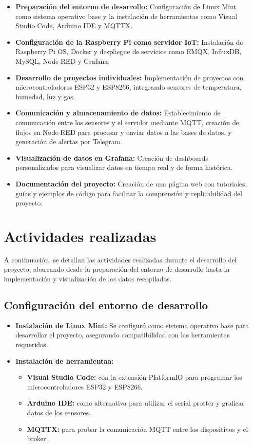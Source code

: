 \begin{itemize}
    \item \textbf{Preparación del entorno de desarrollo:} Configuración de Linux Mint como sistema operativo base y la instalación de herramientas como Visual Studio Code, Arduino IDE y MQTTX.
    \item \textbf{Configuración de la Raspberry Pi como servidor IoT:} Instalación de Raspberry Pi OS, Docker y despliegue de servicios como EMQX, InfluxDB, MySQL, Node-RED y Grafana.
    \item \textbf{Desarrollo de proyectos individuales:} Implementación de proyectos con microcontroladores ESP32 y ESP8266, integrando sensores de temperatura, humedad, luz y gas.
    \item \textbf{Comunicación y almacenamiento de datos:} Establecimiento de comunicación entre los sensores y el servidor mediante MQTT, creación de flujos en Node-RED para procesar y enviar datos a las bases de datos, y generación de alertas por Telegram.
    \item \textbf{Visualización de datos en Grafana:} Creación de dashboards personalizados para visualizar datos en tiempo real y de forma histórica.
    \item \textbf{Documentación del proyecto:} Creación de una página web con tutoriales, guías y ejemplos de código para facilitar la comprensión y replicabilidad del proyecto.
\end{itemize}

\section{Actividades realizadas}

A continuación, se detallan las actividades realizadas durante el desarrollo del proyecto, abarcando desde la preparación del entorno de desarrollo hasta la implementación y visualización de los datos recopilados.

\subsection*{Configuración del entorno de desarrollo}

\begin{itemize}
    \item \textbf{Instalación de Linux Mint:} Se configuró como sistema operativo base para desarrollar el proyecto, asegurando compatibilidad con las herramientas requeridas.
    \item \textbf{Instalación de herramientaa:}
    \begin{itemize}
        \item \textbf{Visual Studio Code:} con la extensión PlatformIO para programar los microcontroladores ESP32 y ESP8266.
        \item \textbf{Arduino IDE:} como alternativa para utilizar el serial protter y graficar datos de los sensores.
        \item \textbf{MQTTX:} para probar la comunicación MQTT entre los dispositivos y el broker.
    \end{itemize}
\end{itemize}

